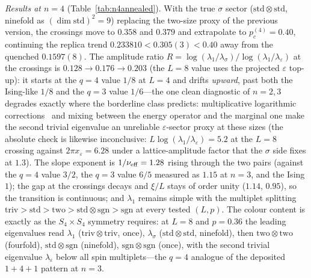 \documentclass[aps,prx,reprint,superscriptaddress,nobibnotes,longbibliography]{revtex4-2}
\theoremstyle{remark}
\begin{document}
\emph{Results at $n=4$} (Table~\ref{tab:n4annealed}).  With the true $\sigma$ sector ($\mathrm{std}\otimes\mathrm{std}$, ninefold as $(\dim\mathrm{std})^2=9$) replacing the two-size proxy of the previous version, the crossings move to $0.358$ and $0.379$ and extrapolate to $p_c^{(4)}=0.40$, continuing the replica trend $0.233810<0.305(3)<0.40$ away from the quenched $0.1597(8)$.  The amplitude ratio $R=\log(\lambda_1/\lambda_\sigma)/\log(\lambda_1/\lambda_\varepsilon)$ at the crossings is $0.128\to0.176\to0.203$ (the $L=8$ value uses the projected $\varepsilon$ top-up): it starts at the $q=4$ value $1/8$ at $L=4$ and drifts \emph{upward}, past both the Ising-like $1/8$ and the $q=3$ value $1/6$---the one clean diagnostic of $n=2,3$ degrades exactly where the borderline class predicts: multiplicative logarithmic corrections~\cite{Cardy1986} and mixing between the energy operator and the marginal one make the second trivial eigenvalue an unreliable $\varepsilon$-sector proxy at these sizes (the absolute check is likewise inconclusive: $L\log(\lambda_1/\lambda_\varepsilon)=5.2$ at the $L=8$ crossing against $2\pi x_\varepsilon=6.28$ under a lattice-amplitude factor that the $\sigma$ side fixes at $1.3$).  The slope exponent is $1/\nu_{\rm eff}=1.28$ rising through the two pairs (against the $q=4$ value $3/2$, the $q=3$ value $6/5$ measured as $1.15$ at $n=3$, and the Ising $1$); the gap at the crossings decays and $\xi/L$ stays of order unity ($1.14$, $0.95$), so the transition is continuous; and $\lambda_1$ remains simple with the multiplet splitting $\mathrm{triv}>\mathrm{std}>\mathrm{two}>\mathrm{std}\otimes\mathrm{sgn}>\mathrm{sgn}$ at every tested $(L,p)$.  The colour content is exactly as the $S_4\times S_4$ symmetry requires: at $L=8$ and $p=0.36$ the leading eigenvalues read $\lambda_1$ ($\mathrm{triv}\otimes\mathrm{triv}$, once), $\lambda_\sigma$ ($\mathrm{std}\otimes\mathrm{std}$, ninefold), then $\mathrm{two}\otimes\mathrm{two}$ (fourfold), $\mathrm{std}\otimes\mathrm{sgn}$ (ninefold), $\mathrm{sgn}\otimes\mathrm{sgn}$ (once), with the second trivial eigenvalue $\lambda_\varepsilon$ below all spin multiplets---the $q=4$ analogue of the deposited $1+4+1$ pattern at $n=3$.
\end{document}
